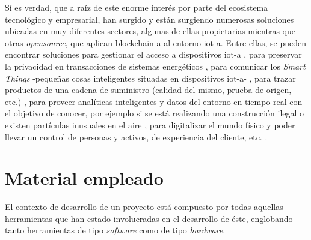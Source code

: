 \documentclass[12pt,a4paper, twoside]{report}
\begin{document}
	Sí es verdad, que a raíz de este enorme interés por parte del ecosistema tecnológico y empresarial, han surgido y están surgiendo numerosas soluciones ubicadas en muy diferentes sectores, algunas de ellas propietarias mientras que otras \textit{\gls{opensource}}, que aplican \gls{blockchain-a} al entorno \gls{iot-a}. Entre ellas, se pueden encontrar soluciones para gestionar el acceso a dispositivos \gls{iot-a} \cite{blockchain:iot:novo}, para preservar la privacidad en transacciones de sistemas energéticos \cite{blockchain:iot:laszka}, para comunicar los \textit{Smart Things} -pequeñas cosas inteligentes situadas en dispositivos \gls{iot-a}- \cite{blockchain:iot:iost}, para trazar productos de una cadena de suministro (calidad del mismo, prueba de origen, etc.) \cite{blockchain:iot:ambrosus}, para proveer analíticas inteligentes y datos del entorno en tiempo real con el objetivo de conocer, por ejemplo si se está realizando una construcción ilegal o existen partículas inusuales en el aire \cite{blockchain:iot:nokia}, para digitalizar el mundo físico y poder llevar un control de personas y activos, de experiencia del cliente, etc. \cite{blockchain:iot:kontakt}.

	\section{Material empleado}\label{tools}
	
	El contexto de desarrollo de un proyecto está compuesto por todas aquellas herramientas que han estado involucradas en el desarrollo de éste, englobando tanto herramientas de tipo \textit{software} como de tipo \textit{hardware}. 
\end{document}
